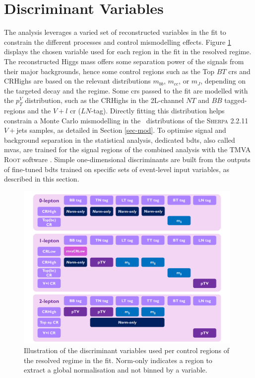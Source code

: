 \section{Discriminant Variables}\label{sec-vh-disc}
The analysis leverages a varied set of reconstructed variables in the fit to constrain the different processes and control mismodelling effects. Figure \ref{fig:variablesControlReg} displays the chosen variable used for each region in the fit in the resolved regime. The reconstructed Higgs mass offers some separation power of the signals from their major backgrounds, hence some control regions such as the Top $BT$ \glspl{cr} and CRHighs are based on the relevant distributions $m_{bb}$, $m_{cc}$, or $m_J$, depending on the targeted decay and the regime. Some \glspl{cr} passed to the fit are modelled with the $p_T^V$ distribution, such as the CRHighs in the 2L-channel $NT$ and $BB$ tagged-regions and the $V+l$ \gls{cr} ($LN$-tag). Directly fitting this distribution helps constrain a Monte Carlo mismodelling in the \ptv\ distributions of the \textsc{Sherpa} 2.2.11 $V+$jets samples, as detailed in Section \ref{sec-mod}. To optimise signal and background separation in the statistical analysis, dedicated \glspl{bdt}, also called \glspl{mva}, are trained for the signal regions of the combined analysis with the \textsc{TMVA} \textsc{Root} software \cite{Therhaag:2011jh}. Simple one-dimensional discriminants are built from the outputs of fine-tuned \glspl{bdt} trained on specific sets of event-level input variables, as described in this section.

\begin{figure}[h!]
  \center
  \includegraphics[width=0.98\textwidth]{Images/VH/Discriminants/Variables.pdf}
  \caption{Illustration of the discriminant variables used per control regions of the resolved regime in the fit. Norm-only indicates a region to extract a global normalisation and not binned by a variable.} %
  \label{fig:variablesControlReg}
\end{figure}

